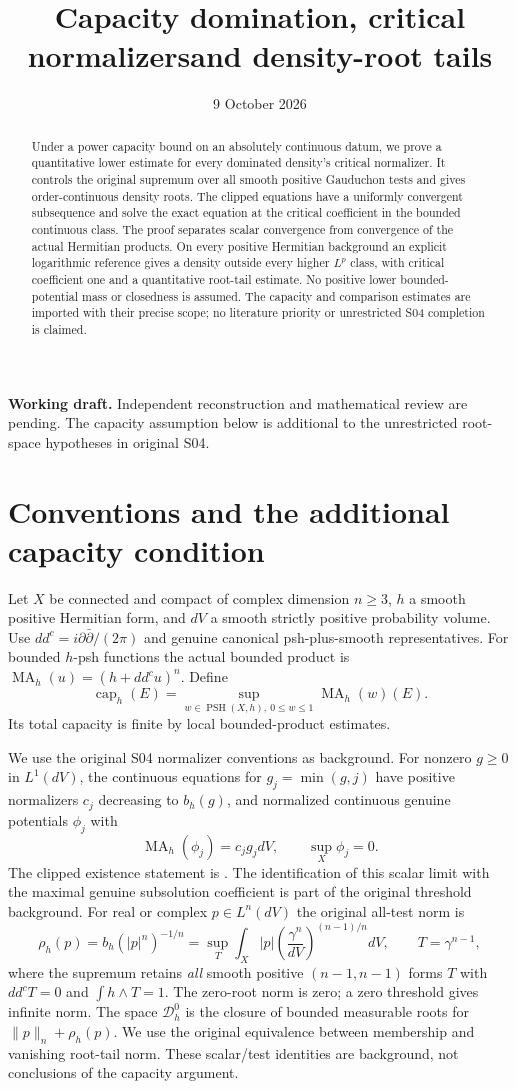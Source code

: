 \documentclass[11pt]{article}
\title{Capacity domination, critical normalizers\newline and density-root tails}
\author{}\date{9 October 2026}
\newcommand{\ddc}{dd^c}
\newcommand{\MA}{\operatorname{MA}}
\newcommand{\capH}{\operatorname{cap}}
\newcommand{\PSH}{\operatorname{PSH}}
\newcommand{\Dzero}{\mathcal D_h^0}
\theoremstyle{remark}\newtheorem{remark}[theorem]{Remark}
\begin{document}
\maketitle
\noindent\textbf{Working draft.} Independent reconstruction and mathematical
review are pending. The capacity assumption below is additional to the
unrestricted root-space hypotheses in original S04.
\begin{abstract}
Under a power capacity bound on an absolutely continuous datum, we prove
a quantitative lower estimate for every dominated density's critical
normalizer. It controls the original supremum over all smooth positive
Gauduchon tests and gives order-continuous density roots. The clipped
equations have a uniformly convergent subsequence and solve the exact
equation at the critical coefficient in the bounded continuous class.
The proof separates scalar convergence from convergence of the actual
Hermitian products. On every positive Hermitian background an explicit
logarithmic reference gives a density outside every higher $L^p$ class,
with critical coefficient one and a quantitative root-tail estimate.
No positive lower bounded-potential mass or closedness is assumed.
The capacity and comparison estimates are imported with their precise
scope; no literature priority or unrestricted S04 completion is claimed.
\end{abstract}

\section{Conventions and the additional capacity condition}
Let $X$ be connected and compact of complex dimension $n\geq3$, $h$ a
smooth positive Hermitian form, and $dV$ a smooth strictly positive
probability volume. Use $\ddc=i\partial\bar\partial/(2\pi)$ and genuine
canonical psh-plus-smooth representatives. For bounded $h$-psh functions
the actual bounded product is $\MA_h(u)=(h+\ddc u)^n$. Define
\[
 \capH_h(E)=\sup_{w\in\PSH(X,h),\ 0\leq w\leq1}\MA_h(w)(E).
\]
Its total capacity is finite by local bounded-product estimates.

We use the original S04 normalizer conventions as background. For
nonzero $g\geq0$ in $L^1(dV)$, the continuous equations for
$g_j=\min(g,j)$ have positive normalizers $c_j$ decreasing to $b_h(g)$,
and normalized continuous genuine potentials $\phi_j$ with
\[
 \MA_h(\phi_j)=c_jg_jdV,\qquad \sup_X\phi_j=0.
\]
The clipped existence statement is \cite[Theorem 0.1]{KN}.
The identification of this scalar limit with the maximal genuine
subsolution coefficient is part of the original threshold background.
For real or complex $p\in L^n(dV)$ the original all-test norm is
\[
 \rho_h(p)=b_h(|p|^n)^{-1/n}
 =\sup_T\int_X|p|\left(\frac{\gamma^n}{dV}\right)^{(n-1)/n}dV,
 \qquad T=\gamma^{n-1},
\]
where the supremum retains \emph{all} smooth positive $(n-1,n-1)$ forms
$T$ with $\ddc T=0$ and $\int h\wedge T=1$. The zero-root norm is zero;
a zero threshold gives infinite norm. The space $\Dzero$ is the closure
of bounded measurable roots for $\|p\|_n+\rho_h(p)$. We use the original
equivalence between membership and vanishing root-tail norm.
These scalar/test identities are background, not conclusions of the
capacity argument.
\end{document}
